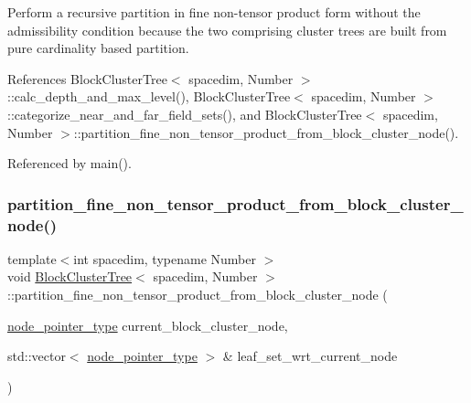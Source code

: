 Perform a recursive partition in fine non-\/tensor product form without the admissibility condition because the two comprising cluster trees are built from pure cardinality based partition. 

References Block\+Cluster\+Tree$<$ spacedim, Number $>$\+::calc\+\_\+depth\+\_\+and\+\_\+max\+\_\+level(), Block\+Cluster\+Tree$<$ spacedim, Number $>$\+::categorize\+\_\+near\+\_\+and\+\_\+far\+\_\+field\+\_\+sets(), and Block\+Cluster\+Tree$<$ spacedim, Number $>$\+::partition\+\_\+fine\+\_\+non\+\_\+tensor\+\_\+product\+\_\+from\+\_\+block\+\_\+cluster\+\_\+node().



Referenced by main().

\mbox{\label{classBlockClusterTree_aa6354696477c8cae61d362b5ec707034}} 
\subsubsection{\texorpdfstring{partition\+\_\+fine\+\_\+non\+\_\+tensor\+\_\+product\+\_\+from\+\_\+block\+\_\+cluster\+\_\+node()}{partition\_fine\_non\_tensor\_product\_from\_block\_cluster\_node()}}
{\footnotesize\ttfamily template$<$int spacedim, typename Number $>$ \\
void \hyperlink{classBlockClusterTree}{Block\+Cluster\+Tree}$<$ spacedim, Number $>$\+::partition\+\_\+fine\+\_\+non\+\_\+tensor\+\_\+product\+\_\+from\+\_\+block\+\_\+cluster\+\_\+node (\begin{DoxyParamCaption}\item[{\hyperlink{classTreeNode}{node\+\_\+pointer\+\_\+type}}]{current\+\_\+block\+\_\+cluster\+\_\+node,  }\item[{std\+::vector$<$ \hyperlink{classTreeNode}{node\+\_\+pointer\+\_\+type} $>$ \&}]{leaf\+\_\+set\+\_\+wrt\+\_\+current\+\_\+node }\end{DoxyParamCaption})\hspace{0.3cm}{\ttfamily [private]}}

